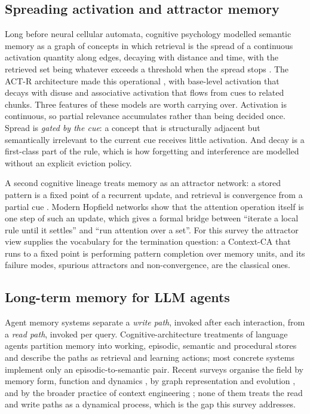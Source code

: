 \documentclass[11pt]{article}
\begin{document}
\subsection{Spreading activation and attractor memory}

Long before neural cellular automata, cognitive psychology modelled semantic memory as a graph of concepts in which retrieval is the spread of a continuous activation quantity along edges, decaying with distance and time, with the retrieved set being whatever exceeds a threshold when the spread stops \cite{collins1975,anderson1983}. The ACT-R architecture made this operational \cite{actr2004}, with base-level activation that decays with disuse and associative activation that flows from cues to related chunks. Three features of these models are worth carrying over. Activation is continuous, so partial relevance accumulates rather than being decided once. Spread is \emph{gated by the cue}: a concept that is structurally adjacent but semantically irrelevant to the current cue receives little activation. And decay is a first-class part of the rule, which is how forgetting and interference are modelled without an explicit eviction policy.

A second cognitive lineage treats memory as an attractor network: a stored pattern is a fixed point of a recurrent update, and retrieval is convergence from a partial cue \cite{hopfield2020}. Modern Hopfield networks show that the attention operation itself is one step of such an update, which gives a formal bridge between ``iterate a local rule until it settles'' and ``run attention over a set''. For this survey the attractor view supplies the vocabulary for the termination question: a Context-CA that runs to a fixed point is performing pattern completion over memory units, and its failure modes, spurious attractors and non-convergence, are the classical ones.

\subsection{Long-term memory for LLM agents}

Agent memory systems separate a \emph{write path}, invoked after each interaction, from a \emph{read path}, invoked per query. Cognitive-architecture treatments of language agents \cite{coala} partition memory into working, episodic, semantic and procedural stores and describe the paths as retrieval and learning actions; most concrete systems implement only an episodic-to-semantic pair. Recent surveys organise the field by memory form, function and dynamics \cite{survey-hu}, by graph representation and evolution \cite{survey-graphmem}, and by the broader practice of context engineering \cite{ctxeng-survey}; none of them treats the read and write paths as a dynamical process, which is the gap this survey addresses.
\end{document}
